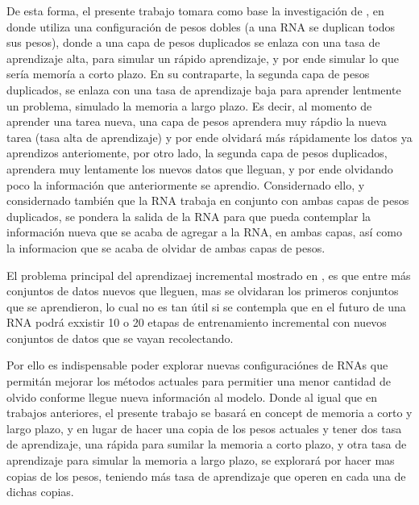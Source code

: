     De esta forma, el presente trabajo tomara como base la investigación de \cite{bullinaria2009}, 
    en donde utiliza una configuración de pesos dobles (a una RNA se duplican todos sus pesos), 
    donde a una capa de pesos duplicados se enlaza con una tasa de aprendizaje alta, para simular un 
    rápido aprendizaje, y por ende simular lo que sería memoría a corto plazo. En su contraparte, 
    la segunda capa de pesos duplicados, se enlaza con una tasa de aprendizaje baja para aprender 
    lentmente un problema, simulado la memoria a largo plazo.  Es decir, al momento de aprender una 
    tarea nueva,  una capa de pesos aprendera muy rápdio la nueva tarea (tasa alta de aprendizaje) y 
    por ende olvidará más rápidamente los datos ya aprendizos anteriomente, por otro lado, la segunda 
    capa de pesos duplicados, aprendera muy lentamente los nuevos datos que lleguan, y por ende olvidando 
    poco la información que anteriormente se aprendio.  Considernado ello, y considernado también que la 
    RNA trabaja en conjunto con ambas capas de pesos duplicados, se pondera la salida de la RNA para 
    que pueda contemplar la información nueva que se acaba de agregar a la RNA, en ambas capas, así como 
    la informacion que se acaba de olvidar de ambas capas de pesos.

    El problema principal del aprendizaej incremental mostrado en \cite{bullinaria2009}, es que entre 
    más conjuntos de datos nuevos que lleguen,  mas se olvidaran los primeros conjuntos que se aprendieron, 
    lo cual no es tan útil si se contempla que en el futuro de una RNA podrá exxistir 10 o 20 etapas de 
    entrenamiento incremental con nuevos conjuntos de datos que se vayan recolectando.

    Por ello es indispensable poder explorar nuevas configuraciónes de RNAs que permitán mejorar los 
    métodos actuales para permitier una menor cantidad de olvido conforme llegue nueva información al 
    modelo. Donde al igual que en trabajos anteriores,  el presente trabajo se basará en concept de 
    memoria a corto y largo plazo,  y en lugar de hacer una copia de los pesos actuales y tener dos 
    tasa de aprendizaje, una rápida para sumilar la memoria a corto plazo, y otra tasa de aprendizaje 
    para simular la memoria a largo plazo, se explorará por hacer mas copias de los pesos,  teniendo más 
    tasa de aprendizaje que operen en cada una de dichas copias.
        







